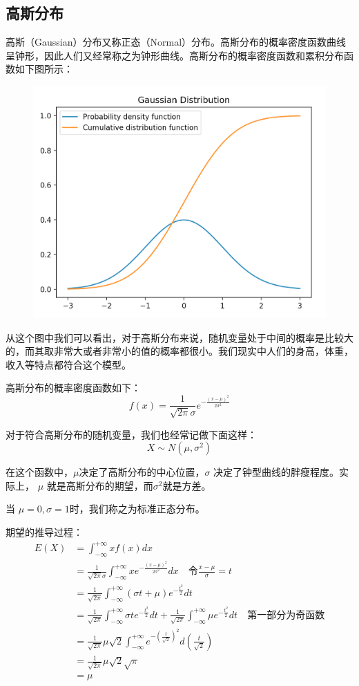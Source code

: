 \documentclass[12pt]{article}
\begin{document}
\subsection{高斯分布}
高斯（Gaussian）分布又称正态（Normal）分布。高斯分布的概率密度函数曲线呈钟形，因此人们又经常称之为钟形曲线。高斯分布的概率密度函数和累积分布函数如下图所示：
\begin{figure}[H]
  \centering
  \includegraphics[width=.8\textwidth]{fig/norm_dist.png} 
\end{figure}

从这个图中我们可以看出，对于高斯分布来说，随机变量处于中间的概率是比较大的，而其取非常大或者非常小的值的概率都很小。我们现实中人们的身高，体重，收入等特点都符合这个模型。

高斯分布的概率密度函数如下：
$$
f(x) = \frac{1}{\sqrt{2 \pi}\sigma}e^{-\frac{(x - \mu)^2}{2\sigma^2}}
$$

对于符合高斯分布的随机变量，我们也经常记做下面这样：
$$
X \sim N(\mu, \sigma^2)
$$

在这个函数中，$\mu$决定了高斯分布的中心位置，$\sigma$ 决定了钟型曲线的胖瘦程度。实际上，
$\mu$ 就是高斯分布的期望，而$\sigma^2$就是方差。

当 $\mu = 0, \sigma = 1$时，我们称之为标准正态分布。

期望的推导过程：
\begin{align}
E(X) &= \int_{-\infty}^{+\infty}xf(x)dx \\
&= \frac{1}{\sqrt{2 \pi}\sigma} \int_{-\infty}^{+\infty}xe^{-\frac{(x - \mu)^2}{2\sigma^2}}dx \quad \text{令} \frac{x-\mu}{\sigma} = t \\
&= \frac{1}{\sqrt{2 \pi}}\int_{-\infty}^{+\infty}(\sigma t+\mu)e^{-\frac{t^2}{2}}dt \\
&=  \frac{1}{\sqrt{2 \pi}}\int_{-\infty}^{+\infty}\sigma te^{-\frac{t^2}{2}}dt + \frac{1}{\sqrt{2 \pi}}\int_{-\infty}^{+\infty}{\mu}e^{-\frac{t^2}{2}}dt \quad \text{第一部分为奇函数} \\
&= \frac{1}{\sqrt{2 \pi}}{\mu}{\sqrt{2}}\int_{-\infty}^{+\infty}e^{-(\frac{t}{\sqrt{2}})^2}d{(\frac{t}{\sqrt{2}})} \\
&=  \frac{1}{\sqrt{2 \pi}}{\mu}{\sqrt{2}\sqrt{\pi}} \\
&= \mu
\end{align}
\end{document}
